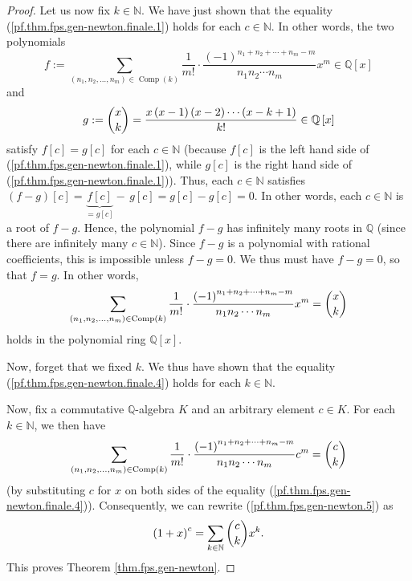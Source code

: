 \begin{proof}
Let us now fix $k\in\mathbb{N}$. We have just shown that the equality
(\ref{pf.thm.fps.gen-newton.finale.1}) holds for each $c\in\mathbb{N}$. In
other words, the two polynomials%
\[
f:=\sum_{\left(  n_{1},n_{2},\ldots,n_{m}\right)  \in\operatorname*{Comp}%
\left(  k\right)  }\dfrac{1}{m!}\cdot\dfrac{\left(  -1\right)  ^{n_{1}%
+n_{2}+\cdots+n_{m}-m}}{n_{1}n_{2}\cdots n_{m}}x^{m}\in\mathbb{Q}\left[
x\right]
\]
and%
\[
g:=\dbinom{x}{k}=\dfrac{x\left(  x-1\right)  \left(  x-2\right)  \cdots\left(
x-k+1\right)  }{k!}\in\mathbb{Q}\left[  x\right]
\]
satisfy $f\left[  c\right]  =g\left[  c\right]  $ for each $c\in\mathbb{N}$
(because $f\left[  c\right]  $ is the left hand side of
(\ref{pf.thm.fps.gen-newton.finale.1}), while $g\left[  c\right]  $ is the
right hand side of (\ref{pf.thm.fps.gen-newton.finale.1})). Thus, each
$c\in\mathbb{N}$ satisfies $\left(  f-g\right)  \left[  c\right]
=\underbrace{f\left[  c\right]  }_{=g\left[  c\right]  }-\,g\left[  c\right]
=g\left[  c\right]  -g\left[  c\right]  =0$. In other words, each
$c\in\mathbb{N}$ is a root of $f-g$. Hence, the polynomial $f-g$ has
infinitely many roots in $\mathbb{Q}$ (since there are infinitely many
$c\in\mathbb{N}$). Since $f-g$ is a polynomial with rational coefficients,
this is impossible unless $f-g=0$. We thus must have $f-g=0$, so that $f=g$.
In other words,
\begin{equation}
\sum_{\left(  n_{1},n_{2},\ldots,n_{m}\right)  \in\operatorname*{Comp}\left(
k\right)  }\dfrac{1}{m!}\cdot\dfrac{\left(  -1\right)  ^{n_{1}+n_{2}%
+\cdots+n_{m}-m}}{n_{1}n_{2}\cdots n_{m}}x^{m}=\dbinom{x}{k}
\label{pf.thm.fps.gen-newton.finale.4}%
\end{equation}
holds in the polynomial ring $\mathbb{Q}\left[  x\right]  $.

Now, forget that we fixed $k$. We thus have shown that the equality
(\ref{pf.thm.fps.gen-newton.finale.4}) holds for each $k\in\mathbb{N}$.

Now, fix a commutative $\mathbb{Q}$-algebra $K$ and an arbitrary element $c\in
K$. For each $k\in\mathbb{N}$, we then have%
\begin{equation}
\sum_{\left(  n_{1},n_{2},\ldots,n_{m}\right)  \in\operatorname*{Comp}\left(
k\right)  }\dfrac{1}{m!}\cdot\dfrac{\left(  -1\right)  ^{n_{1}+n_{2}%
+\cdots+n_{m}-m}}{n_{1}n_{2}\cdots n_{m}}c^{m}=\dbinom{c}{k}
\label{pf.thm.fps.gen-newton.finale.5}%
\end{equation}
(by substituting $c$ for $x$ on both sides of the equality
(\ref{pf.thm.fps.gen-newton.finale.4})). Consequently, we can rewrite
(\ref{pf.thm.fps.gen-newton.5}) as%
\[
\left(  1+x\right)  ^{c}=\sum_{k\in\mathbb{N}}\dbinom{c}{k}x^{k}.
\]
This proves Theorem \ref{thm.fps.gen-newton}.
\end{proof}

